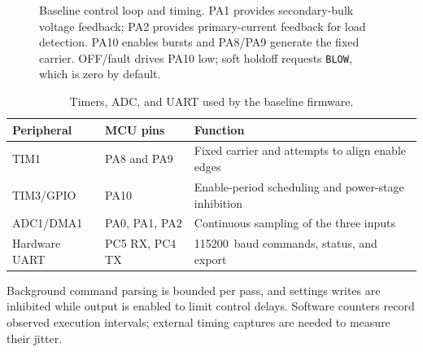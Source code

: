 \begin{figure}[htbp]
\endgroup
\caption{Baseline control loop and timing. PA1 provides secondary-bulk voltage feedback; PA2 provides primary-current feedback for load detection. PA10 enables bursts and PA8/PA9 generate the fixed carrier. OFF/fault drives PA10 low; soft holdoff requests \texttt{BLOW}, which is zero by default.}
\label{fig:ctrl-software-architecture}
\end{figure}

\begin{table}[htbp]
\centering
\caption{Timers, ADC, and UART used by the baseline firmware.}
\label{tab:fw-identity-timing-record}
\begin{tabularx}{\textwidth}{@{}p{}p{}X@{}}
\toprule
Peripheral & MCU pins & Function\\
\midrule
TIM1 & PA8 and PA9 & Fixed carrier and attempts to align enable edges\\
TIM3/GPIO & PA10 & Enable-period scheduling and power-stage inhibition\\
ADC1/DMA1 & PA0, PA1, PA2 & Continuous sampling of the three inputs\\
Hardware UART & PC5 RX, PC4 TX & \SI{115200}{baud} commands, status, and export\\
\bottomrule
\end{tabularx}
\end{table}

Background command parsing is bounded per pass, and settings writes are inhibited while output is enabled to limit control delays. Software counters record observed execution intervals; external timing captures are needed to measure their jitter.
